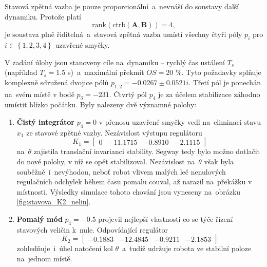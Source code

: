 \documentclass[conference]{IEEEtran}
\begin{document}
Stavová zpětná vazba je pouze proporcionální~a~nevnáší do soustavy další dynamiku. Protože platí
\begin{equation}
    \text{rank}(\text{ctrb}(\mathbf{A}, \mathbf{B})) = 4,
\end{equation}
je soustava plně řiditelná~a~stavová zpětná vazba umístí všechny čtyři póly $p_i$ pro $i \in \left\{1, 2,3,4\right\}$ uzavřené smyčky.

V zadání úlohy jsou stanoveny cíle na~dynamiku -- rychlý čas ustálení $T_s$ (například $T_s = 1.5$ \si{\second})~a~maximální překmit $OS = 20$ \%.
Tyto požadavky  splňuje komplexně sdružená dvojice pólů $p_{1,2} = -0.0267 \pm 0.0521i$.
Třetí pól je ponechán na~svém místě v bodě $p_3 = -231$. Čtvrtý pól $p_4$ je za účelem stabilizace záhodno umístit blízko počátku.
Byly nalezeny dvě významné polohy:
\begin{enumerate}
    \item \textbf{Čistý integrátor} $p_4 = 0$ v přenosu uzavřené smyčky vedl na~eliminaci stavu $x_1$ ze stavové zpětné vazby.
    Nezávislost výstupu regulátoru 
    \begin{equation*}
        K_1 = \begin{bmatrix}
            0 & -11.1715  & -0.8910  & -2.1115
        \end{bmatrix}
    \end{equation*}
    na~$\theta$ zajistila translační invarianci stability. Segway tedy bylo možno dotlačit do nové polohy, v níž se opět stabilizoval. Nezávislost na~$\theta$
    však byla souběžně~i~nevýhodou, neboť robot vlivem malých leč nenulových regulačních odchylek během času pomalu couval, až narazil na~překážku v místnosti.
    Výsledky simulace tohoto chování jsou vyneseny na~obrázku \ref{fig:stavova_K2_nelin}.

    \item \textbf{Pomalý mód} $p_4 = -0.5$ projevil nejlepší vlastnosti co se týče řízení stavových veličin k~nule. Odpovídající regulátor
    \begin{equation*}
        K_2 = \begin{bmatrix}
            -0.1883 & -12.4845 &  -0.9211 &  -2.1853
        \end{bmatrix}
    \end{equation*}
    zohledňuje~i~úhel natočení kol $\theta$~a~tudíž udržuje robota ve stabilní poloze na~jednom místě.
\end{enumerate}
\end{document}
